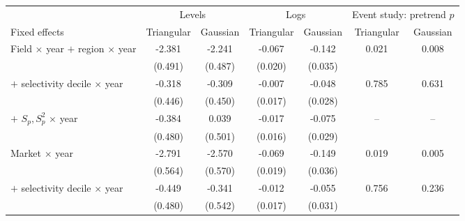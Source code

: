 \begin{tabular}{lcccccc}
\toprule
 & \multicolumn{2}{c}{Levels} & \multicolumn{2}{c}{Logs} & \multicolumn{2}{c}{Event study: pretrend \(p\)} \\
\cmidrule(lr){2-3}\cmidrule(lr){4-5}\cmidrule(lr){6-7}
Fixed effects & Triangular & Gaussian & Triangular & Gaussian & Triangular & Gaussian \\
\midrule
Field \(\times\) year \(+\) region \(\times\) year & -2.381\sym{***} & -2.241\sym{***} & -0.067\sym{***} & -0.142\sym{***} & 0.021 & 0.008 \\
 & (0.491) & (0.487) & (0.020) & (0.035) & & \\
\quad \(+\) selectivity decile \(\times\) year & -0.318 & -0.309 & -0.007 & -0.048\sym{*} & 0.785 & 0.631 \\
 & (0.446) & (0.450) & (0.017) & (0.028) & & \\
\quad \(+\) \(S_p, S_p^2\) \(\times\) year & -0.384 &  0.039 & -0.017 & -0.075\sym{**} & -- & -- \\
 & (0.480) & (0.501) & (0.016) & (0.029) & & \\
\addlinespace
Market \(\times\) year & -2.791\sym{***} & -2.570\sym{***} & -0.069\sym{***} & -0.149\sym{***} & 0.019 & 0.005 \\
 & (0.564) & (0.570) & (0.019) & (0.036) & & \\
\quad \(+\) selectivity decile \(\times\) year & -0.449 & -0.341 & -0.012 & -0.055\sym{*} & 0.756 & 0.236 \\
 & (0.480) & (0.542) & (0.017) & (0.031) & & \\
\bottomrule
\end{tabular}
